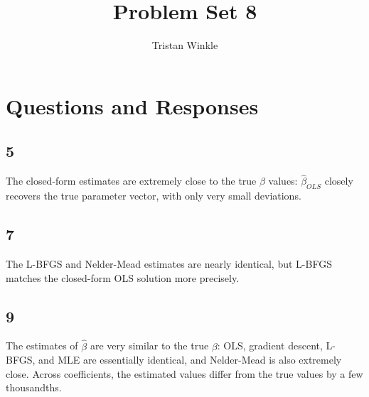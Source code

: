 \documentclass[12pt]{article}
\title{Problem Set 8}
\author{Tristan Winkle}
\date{}
\begin{document}
\maketitle

\section{Questions and Responses}

\subsection*{5}

\noindent The closed-form estimates are extremely close to the true $\beta$ values: $\hat\beta_{OLS}$ closely recovers the true parameter vector, with only very small deviations.

\subsection*{7}

\noindent The L-BFGS and Nelder-Mead estimates are nearly identical, but L-BFGS matches the closed-form OLS solution more precisely.  

\subsection*{9}

The estimates of $\hat\beta$ are very similar to the true $\beta$: OLS, gradient descent, L-BFGS, and MLE are essentially identical, and Nelder-Mead is also extremely close. Across coefficients, the estimated values differ from the true values by a few thousandths.

\pagebreak
\end{document}
